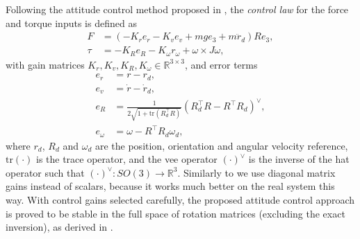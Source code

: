 Following the attitude control method proposed in \cite{lelemc2010}, the \textit{control law} for the force and torque inputs is defined as
\begin{subequations}\label{eq:geomlaw}
\begin{align}
    F&= (-K_r e_r - K_v e_v + m g e_3+m \ddot r_d) R e_3,\\
    \tau &= -K_R e_R - K_\omega r_\omega + \omega\times J \omega,\label{eq:geomtau}
\end{align}
\end{subequations}
with gain matrices $K_r, K_v, K_R, K_\omega \in \mathbb{R}^{3\times 3}$, and error terms
\begin{subequations}\label{eq:geomerrors}
\begin{align}
    e_r &= r-r_d,\\
    e_v &= \dot r - \dot r_d,\\
    e_R &= \frac{1}{2\sqrt{1+\mathrm{tr}\left( R_d^\top R \right)}}\left(R_d^\top R - R^\top R_d\right)^\vee,\\
    e_\omega &= \omega - R^\top R_d\omega_d,
\end{align}
\end{subequations}
where $r_d$, $R_d$ and $\omega_d$ are the position, orientation and angular velocity reference, $\mathrm{tr}(\cdot)$ is the trace operator, and the vee operator $(\cdot)^\vee$ is the inverse of the hat operator such that $(\cdot)^\vee:SO(3)\rightarrow \mathbb{R}^3$. Similarly to \cite{mellinger2011} we use diagonal matrix gains instead of scalars, because it works much better on the real system this way. With control gains selected carefully, the proposed attitude control approach is proved to be stable in the full space of rotation matrices (excluding the exact inversion), as derived in \cite{lelemc2010}.

